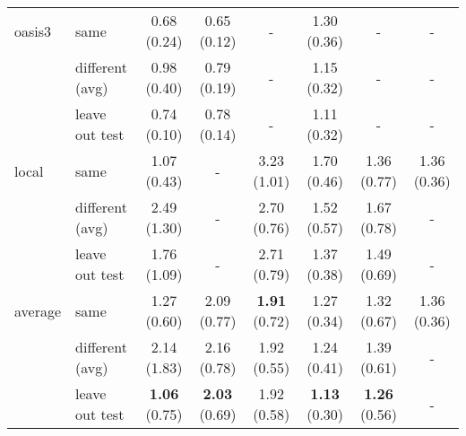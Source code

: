 \begin{table*}
\begin{tabular}{llcccccc}
\midrule
oasis3 & same           &  0.68 (0.24) &  0.65 (0.12) &            - &  1.30 (0.36) &            - &            - \\
       & different (avg)    &  0.98 (0.40) &  0.79 (0.19) &            - &  1.15 (0.32) &            - &            - \\
       & leave out test &  0.74 (0.10) &  0.78 (0.14) &            - &  1.11 (0.32) &            - &            - \\
\midrule
local  & same           &  1.07 (0.43) &            - &  3.23 (1.01) &  1.70 (0.46) &  1.36 (0.77) &  1.36 (0.36) \\
       & different (avg)    &  2.49 (1.30) &            - &  2.70 (0.76) &  1.52 (0.57) &  1.67 (0.78) &            - \\
       & leave out test &  1.76 (1.09) &            - &  2.71 (0.79) &  1.37 (0.38) &  1.49 (0.69) &            - \\
\midrule
\midrule
average& same           &  1.27 (0.60) &  2.09 (0.77) &  \textbf{1.91} (0.72) &  1.27 (0.34) &  1.32 (0.67) &  1.36 (0.36) \\
       & different (avg)    &  2.14 (1.83) &  2.16 (0.78) &  1.92 (0.55) &  1.24 (0.41) &  1.39 (0.61) &            - \\
       & leave out test &  \textbf{1.06} (0.75) &  \textbf{2.03} (0.69) &  1.92 (0.58) &  \textbf{1.13} (0.30) &  \textbf{1.26} (0.56) &            - \\
\bottomrule
\end{tabular}
\end{table*}
